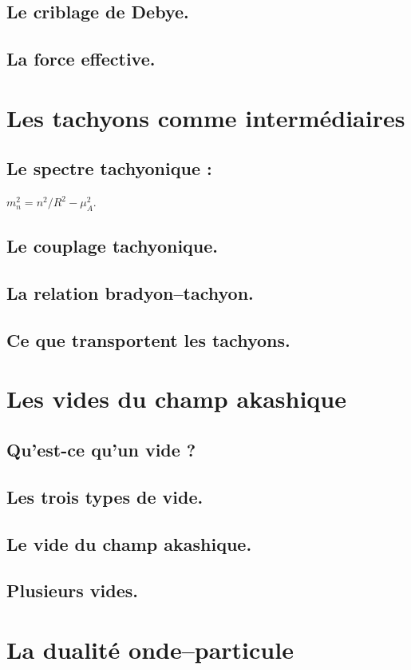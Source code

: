 \subsection{Le criblage de Debye.}
\subsection{La force effective.}

\section{Les tachyons comme intermédiaires}
\subsection{Le spectre tachyonique :} $m_n^2 = n^2/R^2 - \mu_A^2$.
\subsection{Le couplage tachyonique.}
\subsection{La relation bradyon--tachyon.}
\subsection{Ce que transportent les tachyons.}

\section{Les vides du champ akashique}
\subsection{Qu'est-ce qu'un vide ?}
\subsection{Les trois types de vide.}
\subsection{Le vide du champ akashique.}
\subsection{Plusieurs vides.}

\section{La dualité onde--particule}
